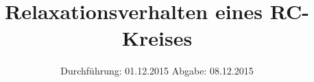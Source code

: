 
\usepackage[frak=boondox]{mathalfa}
\subject{353}
\title{Relaxationsverhalten eines RC-Kreises}
\date{
  Durchführung: 01.12.2015
  \hspace{3em}
  Abgabe: 08.12.2015
}



\maketitle
\newpage
\mbox{}
\newpage
\thispagestyle{empty}
\tableofcontents
\newpage





\nocite{numpy}
\nocite{matplotlib}
\nocite{uncertainties}
\printbibliography


